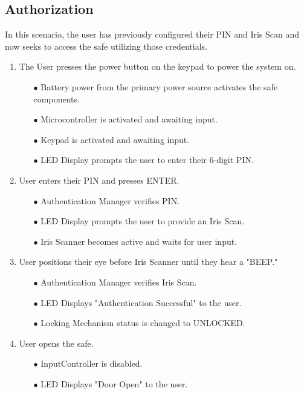 \documentclass{article}
\begin{document}
\subsection{Authorization}
In this scenario, the user has previously configured their PIN and Iris Scan and now seeks to access the safe utilizing those credentials.

\begin{enumerate}
    \item The User presses the power button on the keypad to power the system on.
    \begin{enumerate}
        \item[$\bullet$] Battery power from the primary power source activates the safe components.
        \item[$\bullet$] Microcontroller is activated and awaiting input.
        \item[$\bullet$] Keypad is activated and awaiting input.
        \item[$\bullet$] LED Display prompts the user to enter their 6-digit PIN.
    \end{enumerate}
    \item User enters their PIN and presses ENTER.
    \begin{enumerate}
        \item[$\bullet$] Authentication Manager verifies PIN.
        \item[$\bullet$] LED Display prompts the user to provide an Iris Scan.
        \item[$\bullet$] Iris Scanner becomes active and waits for user input.
    \end{enumerate}
    \item User positions their eye before Iris Scanner until they hear a "BEEP."
    \begin{enumerate}
        \item[$\bullet$] Authentication Manager verifies Iris Scan.
        \item[$\bullet$] LED Displays "Authentication Successful" to the user.
        \item[$\bullet$] Locking Mechanism status is changed to UNLOCKED.
    \end{enumerate}
    \item User opens the safe.
    \begin{enumerate}
        \item[$\bullet$] InputController is disabled.
        \item[$\bullet$] LED Displays "Door Open" to the user.

\end{enumerate}
\end{enumerate}
\end{document}
